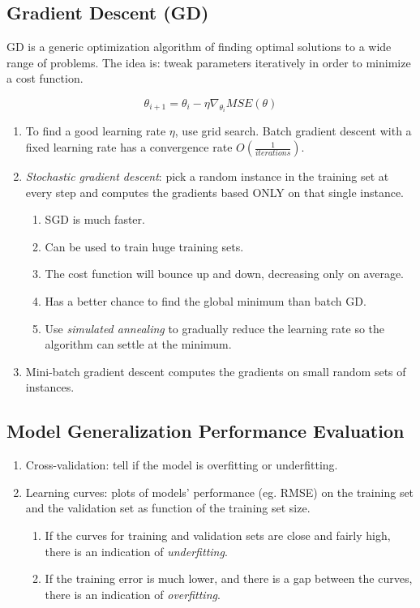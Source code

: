 \documentclass[12pt,oneside,a4paper]{article}
\numberwithin{equation}{section}
\begin{document}
\subsection{Gradient Descent (GD)}
GD is a generic optimization algorithm of finding optimal solutions to a wide range of problems. The idea is: tweak parameters iteratively in order to minimize a cost function.

\begin{equation}
\theta_{i+1} = \theta_i - \eta \nabla_{\theta_i} MSE(\theta)
\end{equation}
\begin{enumerate}
\item  To find a good learning rate $\eta$, use grid search. Batch gradient descent with a fixed learning rate has a convergence rate $O(\frac{1}{iterations})$.

\item \emph{Stochastic gradient descent}: pick a random instance in the training set at every step and computes the gradients based ONLY on that single instance. 

\begin{enumerate}
\item SGD is much faster. 
\item Can be used to train huge training sets. 
\item The cost function will bounce up and down, decreasing only on average. 
\item Has a better chance to find the global minimum than batch GD.
\item Use \emph{simulated annealing} to gradually reduce the learning rate so the algorithm can settle at the minimum.
\end{enumerate}

\item Mini-batch gradient descent computes the gradients on small random sets of instances.
\end{enumerate}

\subsection{Model Generalization Performance Evaluation}
\begin{enumerate}
\item Cross-validation: tell if the model is overfitting or underfitting.
\item Learning curves: plots of models' performance (eg. RMSE) on the training set and the validation set as function of the training set size.
\begin{enumerate}
\item If the curves for training and validation sets are close and fairly high, there is an indication of \emph{underfitting}.
\item If the training error is much lower, and there is a gap between the curves, there is an indication of \emph{overfitting}.
\end{enumerate}
\end{enumerate}
\end{document}
